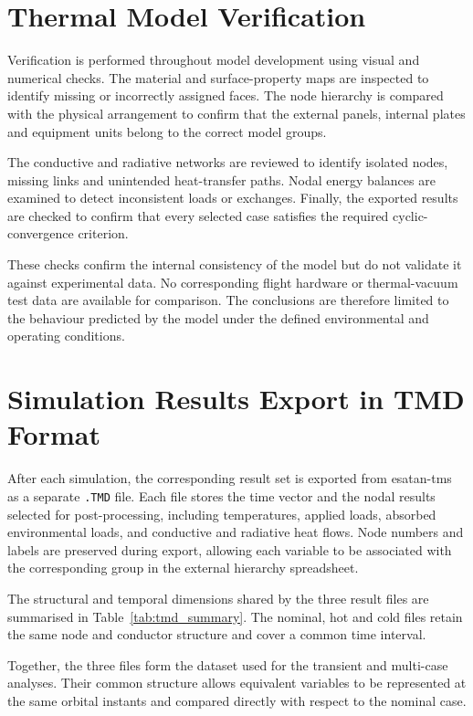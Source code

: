 \section{Thermal Model Verification}
\label{sec:thermal_model_verification}

Verification is performed throughout model development using visual and
numerical checks. The material and surface-property maps are inspected to
identify missing or incorrectly assigned faces. The node hierarchy is 
compared with the physical arrangement to confirm that the external panels,
internal plates and equipment units belong to the correct model groups.

The conductive and radiative networks are reviewed to identify isolated nodes,
missing links and unintended heat-transfer paths. Nodal energy balances are
examined to detect inconsistent loads or exchanges. Finally, the exported
results are checked to confirm that every selected case satisfies the required
cyclic-convergence criterion.

These checks confirm the internal consistency of the model but do not validate it
against experimental data. No corresponding flight hardware or thermal-vacuum
test data are available for comparison. The conclusions are therefore limited
to the behaviour predicted by the model under the defined environmental and
operating conditions.


\section{Simulation Results Export in TMD Format}
\label{sec:tmd_export}

After each simulation, the corresponding result set is exported from
\acrshort{esatan-tms} as a separate \texttt{.TMD} file. Each file stores the
time vector and the nodal results selected for post-processing, including
temperatures, applied loads, absorbed environmental loads, and conductive and
radiative heat flows. Node numbers and labels are preserved during export,
allowing each variable to be associated with the corresponding group in the
external hierarchy spreadsheet.

The structural and temporal dimensions shared by the three result files are
summarised in Table~\ref{tab:tmd_summary}. The nominal, hot and cold files
retain the same node and conductor structure and cover a common time
interval.

Together, the three files form the dataset used for the transient and
multi-case analyses. Their common structure allows equivalent variables to
be represented at the same orbital instants and compared directly with
respect to the nominal case.

